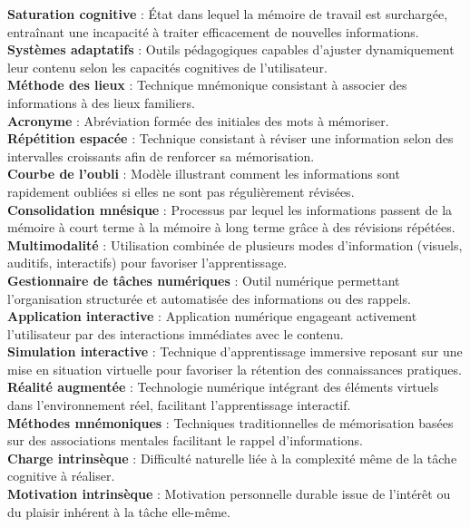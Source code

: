 \documentclass[11pt,a4paper]{report}
\begin{document}
\textbf{Saturation cognitive} : État dans lequel la mémoire de travail est surchargée, entraînant une incapacité à traiter efficacement de nouvelles informations.\\
\textbf{Systèmes adaptatifs} : Outils pédagogiques capables d'ajuster dynamiquement leur contenu selon les capacités cognitives de l’utilisateur.\\
\textbf{Méthode des lieux} : Technique mnémonique consistant à associer des informations à des lieux familiers.\\
\textbf{Acronyme} : Abréviation formée des initiales des mots à mémoriser.\\
\textbf{Répétition espacée} : Technique consistant à réviser une information selon des intervalles croissants afin de renforcer sa mémorisation.\\
\textbf{Courbe de l’oubli} : Modèle illustrant comment les informations sont rapidement oubliées si elles ne sont pas régulièrement révisées.\\
\textbf{Consolidation mnésique} : Processus par lequel les informations passent de la mémoire à court terme à la mémoire à long terme grâce à des révisions répétées.\\
\textbf{Multimodalité} : Utilisation combinée de plusieurs modes d’information (visuels, auditifs, interactifs) pour favoriser l'apprentissage.\\
\textbf{Gestionnaire de tâches numériques} : Outil numérique permettant l’organisation structurée et automatisée des informations ou des rappels.\\
\textbf{Application interactive} : Application numérique engageant activement l’utilisateur par des interactions immédiates avec le contenu.\\
\textbf{Simulation interactive} : Technique d'apprentissage immersive reposant sur une mise en situation virtuelle pour favoriser la rétention des connaissances pratiques.\\
\textbf{Réalité augmentée} : Technologie numérique intégrant des éléments virtuels dans l'environnement réel, facilitant l'apprentissage interactif.\\
\textbf{Méthodes mnémoniques} : Techniques traditionnelles de mémorisation basées sur des associations mentales facilitant le rappel d’informations.\\
\textbf{Charge intrinsèque} : Difficulté naturelle liée à la complexité même de la tâche cognitive à réaliser.\\
\textbf{Motivation intrinsèque} : Motivation personnelle durable issue de l'intérêt ou du plaisir inhérent à la tâche elle-même.\\
\end{document}
